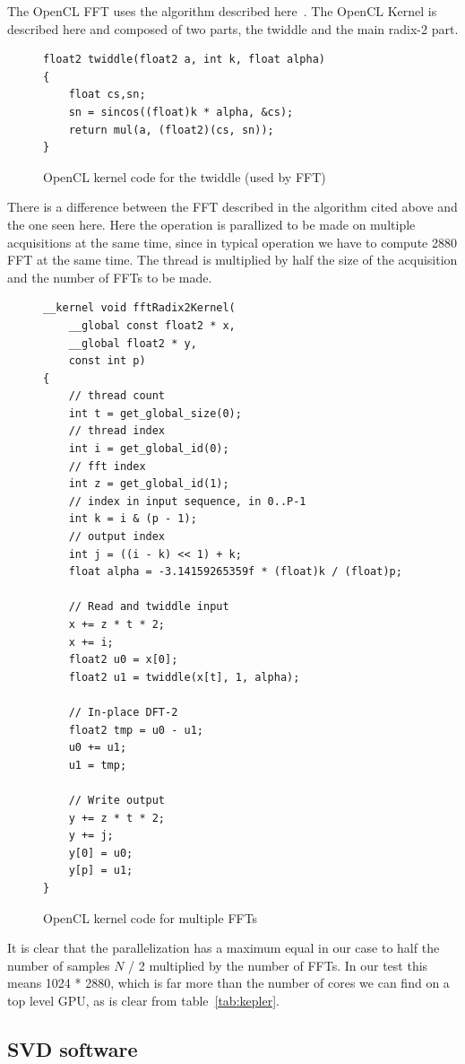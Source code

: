 The \gls{OpenCL} \gls{FFT} uses the algorithm described here~\cite{Govindaraju07}. The OpenCL Kernel is described here and composed of two parts, the twiddle and the main radix-2 part.

\begin{figure}[H]
\centering
\caption{OpenCL kernel code for the twiddle (used by FFT)}
\label{fig:twidle_cl}
\begin{lstlisting}
float2 twiddle(float2 a, int k, float alpha)
{
	float cs,sn;
	sn = sincos((float)k * alpha, &cs);
	return mul(a, (float2)(cs, sn));
}
\end{lstlisting}
\end{figure}

There is a difference between the \gls{FFT} described in the algorithm
cited above and the one seen here. Here the operation is parallized to
be made on multiple acquisitions at the same time, since in typical
operation we have to compute 2880 FFT at the same time. The thread is
multiplied by half the size of the acquisition and the number of
\glspl{FFT} to be made.

\begin{figure}[H]
\centering
\caption{OpenCL kernel code for multiple FFTs}
\label{fig:fft_cl}
\begin{lstlisting}
__kernel void fftRadix2Kernel(
	__global const float2 * x,
	__global float2 * y,
	const int p)
{
	// thread count
	int t = get_global_size(0);
	// thread index
  	int i = get_global_id(0);
	// fft index
  	int z = get_global_id(1);
  	// index in input sequence, in 0..P-1
  	int k = i & (p - 1);
  	// output index
  	int j = ((i - k) << 1) + k;
  	float alpha = -3.14159265359f * (float)k / (float)p;
  	
	// Read and twiddle input
	x += z * t * 2;
	x += i;
	float2 u0 = x[0];
	float2 u1 = twiddle(x[t], 1, alpha);
	
	// In-place DFT-2
	float2 tmp = u0 - u1; 
	u0 += u1; 
	u1 = tmp;
	
	// Write output
	y += z * t * 2;
	y += j;
	y[0] = u0;
	y[p] = u1;
}
\end{lstlisting}
\end{figure}

It is clear that the parallelization has a maximum equal in our case to half the number of samples $N$ / 2 multiplied by the number of \glspl{FFT}. In our test this means 1024 * 2880, which is far more than the number of cores we can find on a top level \gls{GPU}, as is clear from table~\ref{tab:kepler}.

\subsection{SVD software}


